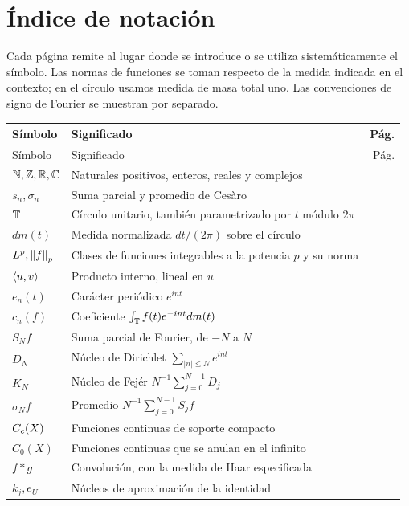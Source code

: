 \chapter{Índice de notación}
Cada página remite al lugar donde se introduce o se utiliza sistemáticamente el símbolo. Las normas de funciones se toman respecto de la medida indicada en el contexto; en el círculo usamos medida de masa total uno. Las convenciones de signo de Fourier se muestran por separado.
\small
\begin{longtable}{@{}p{}p{}r@{}}
\toprule Símbolo & Significado & Pág.\\\midrule
\endfirsthead
\toprule Símbolo & Significado & Pág.\\\midrule
\endhead
\bottomrule\endfoot
$\mathbb N,\mathbb Z,\mathbb R,\mathbb C$ & Naturales positivos, enteros, reales y complejos & \pageref{cap:v4-01}\\
$s_n,\sigma_n$ & Suma parcial y promedio de Cesàro & \pageref{cap:v4-01}\\
$\mathbb T$ & Círculo unitario, también parametrizado por $t$ módulo $2\pi$ & \pageref{cap:v4-02}\\
$dm(t)$ & Medida normalizada $dt/(2\pi)$ sobre el círculo & \pageref{cap:v4-02}\\
$L^p,\left\lVert f\right\rVert_p$ & Clases de funciones integrables a la potencia $p$ y su norma & \pageref{cap:v4-02}\\
$\left\langle u,v\right\rangle$ & Producto interno, lineal en $u$ & \pageref{cap:v4-02}\\
$e_n(t)$ & Carácter periódico $e^{int}$ & \pageref{cap:v4-02}\\
$c_n(f)$ & Coeficiente $\int_\mathbb T f(t)e^{-int}dm(t)$ & \pageref{cap:v4-02}\\
$S_Nf$ & Suma parcial de Fourier, de $-N$ a $N$ & \pageref{cap:v4-03}\\
$D_N$ & Núcleo de Dirichlet $\sum_{|n|\le N}e^{int}$ & \pageref{cap:v4-03}\\
$K_N$ & Núcleo de Fejér $N^{-1}\sum_{j=0}^{N-1}D_j$ & \pageref{cap:v4-03}\\
$\sigma_N f$ & Promedio $N^{-1}\sum_{j=0}^{N-1}S_jf$ & \pageref{cap:v4-03}\\
$C_c(X)$ & Funciones continuas de soporte compacto & \pageref{cap:v4-04}\\
$C_0(X)$ & Funciones continuas que se anulan en el infinito & \pageref{cap:v4-07}\\
$f*g$ & Convolución, con la medida de Haar especificada & \pageref{cap:v4-05}\\
$k_j,e_U$ & Núcleos de aproximación de la identidad & \pageref{cap:v4-05}\\

\end{longtable}
